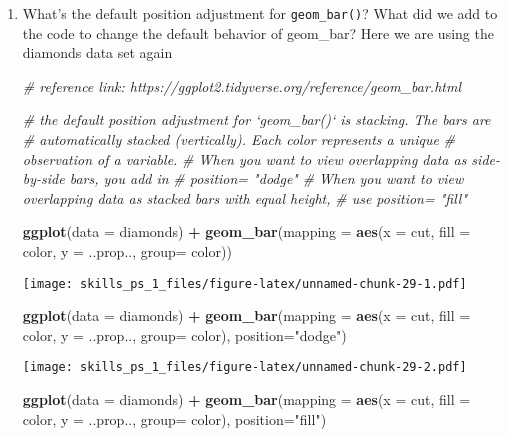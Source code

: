 \documentclass[
]{article}
\newenvironment{Shaded}{\begin{snugshade}}{\end{snugshade}}
\newcommand{\CommentTok}[1]{\textcolor[rgb]{0.56,0.35,0.01}{\textit{#1}}}
\newcommand{\DataTypeTok}[1]{\textcolor[rgb]{0.13,0.29,0.53}{#1}}
\newcommand{\KeywordTok}[1]{\textcolor[rgb]{0.13,0.29,0.53}{\textbf{#1}}}
\newcommand{\NormalTok}[1]{#1}
\newcommand{\OperatorTok}[1]{\textcolor[rgb]{0.81,0.36,0.00}{\textbf{#1}}}
\newcommand{\StringTok}[1]{\textcolor[rgb]{0.31,0.60,0.02}{#1}}
\begin{document}
\begin{enumerate}
\def\labelenumi{\arabic{enumi}.}
\item
  What's the default position adjustment for \texttt{geom\_bar()}? What
  did we add to the code to change the default behavior of geom\_bar?
  Here we are using the diamonds data set again

\begin{Shaded}
\begin{Highlighting}[]
\CommentTok{# reference link: https://ggplot2.tidyverse.org/reference/geom_bar.html}

\CommentTok{# the default position adjustment for `geom_bar()` is stacking. The bars are}
\CommentTok{# automatically stacked (vertically). Each color represents a unique }
\CommentTok{# observation of a variable.}
\CommentTok{# When you want to view overlapping data as side-by-side bars, you add in}
\CommentTok{# position= "dodge"}
\CommentTok{# When you want to view overlapping data as stacked bars with equal height,}
\CommentTok{# use position= "fill"}

\KeywordTok{ggplot}\NormalTok{(}\DataTypeTok{data =}\NormalTok{ diamonds) }\OperatorTok{+}\StringTok{ }
\StringTok{  }\KeywordTok{geom_bar}\NormalTok{(}\DataTypeTok{mapping =} \KeywordTok{aes}\NormalTok{(}\DataTypeTok{x =}\NormalTok{ cut, }\DataTypeTok{fill =}\NormalTok{ color, }\DataTypeTok{y =}\NormalTok{ ..prop.., }\DataTypeTok{group=}\NormalTok{ color))}
\end{Highlighting}
\end{Shaded}

  \texttt{[image: skills\_ps\_1\_files/figure-latex/unnamed-chunk-29-1.pdf]}

\begin{Shaded}
\begin{Highlighting}[]
\KeywordTok{ggplot}\NormalTok{(}\DataTypeTok{data =}\NormalTok{ diamonds) }\OperatorTok{+}\StringTok{ }
\StringTok{  }\KeywordTok{geom_bar}\NormalTok{(}\DataTypeTok{mapping =} \KeywordTok{aes}\NormalTok{(}\DataTypeTok{x =}\NormalTok{ cut, }\DataTypeTok{fill =}\NormalTok{ color, }\DataTypeTok{y =}\NormalTok{ ..prop.., }\DataTypeTok{group=}\NormalTok{ color), }
           \DataTypeTok{position=}\StringTok{"dodge"}\NormalTok{)}
\end{Highlighting}
\end{Shaded}

  \texttt{[image: skills\_ps\_1\_files/figure-latex/unnamed-chunk-29-2.pdf]}

\begin{Shaded}
\begin{Highlighting}[]
    \KeywordTok{ggplot}\NormalTok{(}\DataTypeTok{data =}\NormalTok{ diamonds) }\OperatorTok{+}\StringTok{ }
\StringTok{  }\KeywordTok{geom_bar}\NormalTok{(}\DataTypeTok{mapping =} \KeywordTok{aes}\NormalTok{(}\DataTypeTok{x =}\NormalTok{ cut, }\DataTypeTok{fill =}\NormalTok{ color, }\DataTypeTok{y =}\NormalTok{ ..prop.., }\DataTypeTok{group=}\NormalTok{ color), }
           \DataTypeTok{position=}\StringTok{"fill"}\NormalTok{)}
\end{Highlighting}
\end{Shaded}


\end{enumerate}
\end{document}
